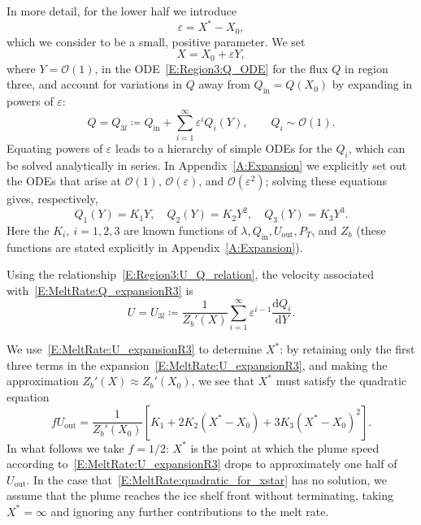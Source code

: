 \documentclass{jfm}
\newcommand{\dd}[2]{\frac{\mathrm{d} #1}{\mathrm{d} #2}}
\newcommand{\order}[1]{\mathcal{O}(#1)}
\newcommand{\Pt}{\textit{P}_T}
\renewcommand{\in}{\text{in}} %
\newcommand{\out}{\text{out}}
\begin{document}
In more detail, for the lower half we introduce 
\begin{equation}
\varepsilon = X^* - X_0,
\end{equation}
which we consider to be a small, positive parameter. We set 
\begin{equation}
X = X_0 + \varepsilon Y,
\end{equation}
where  $Y = \order{1}$, in the ODE~\eqref{E:Region3:Q_ODE} for the flux $Q$ in region three, and account for variations in $Q$ away from $Q_{\text{in}} = Q(X_0)$ by expanding in powers of $\varepsilon$:
\begin{equation}\label{E:MeltRate:Q_expansionR3}
Q = Q_{3l} \coloneqq   Q_\in  + \sum_{i = 1}^{\infty} \varepsilon^i Q_i(Y), \qquad Q_i \sim \order{1}.
 \end{equation}
Equating powers of $\varepsilon$ leads to a hierarchy of simple ODEs for the $Q_i$, which can be solved analytically in series. In Appendix~\ref{A:Expansion} we explicitly set out the ODEs that arise at $\order{1}$, $\order{\varepsilon}$, and $\order{\varepsilon^2}$; solving these equations gives, respectively,
\begin{equation}
Q_1(Y) = K_1 Y, \quad Q_2(Y) = K_2 Y^2, \quad Q_3(Y) =K_3 Y^3.
\end{equation}
Here the $K_i,~i = 1,2,3$ are known functions of $\lambda, Q_\in, U_\out, \Pt$, and $Z_b$ (these functions are stated explicitly in Appendix~\ref{A:Expansion}). 

Using the relationship~\eqref{E:Region3:U_Q_relation}, the velocity associated with~\eqref{E:MeltRate:Q_expansionR3} is
 \begin{equation}\label{E:MeltRate:U_expansionR3}
U = U_{3l} \coloneqq \frac{1}{Z_b'(X)} \sum_{i = 1}^{\infty} \varepsilon^{i-1} \dd{Q_i}{Y}.
\end{equation}

We use~\eqref{E:MeltRate:U_expansionR3} to determine $X^*$: by retaining only the first three terms in the expansion~\eqref{E:MeltRate:U_expansionR3}, and making the approximation  $Z_b'(X) \approx Z_b'(X_0)$, we see that $X^*$ must satisfy the quadratic equation
\begin{equation}\label{E:MeltRate:quadratic_for_xstar}
f U_\out = \frac{1}{Z_b'(X_0)}\left[K_1 + 2 K_2(X^* - X_0) + 3K_3(X^* - X_0)^2 \right].
\end{equation}
In what follows we take $f = 1/2$: $X^*$ is the point at which the plume speed according to~\eqref{E:MeltRate:U_expansionR3} drops to approximately one half of $U_\out$. In the case that~\eqref{E:MeltRate:quadratic_for_xstar} has no solution, we assume that the plume reaches the ice shelf front without terminating, taking $X^* = \infty$ and ignoring any further contributions to the melt rate.
\end{document}
